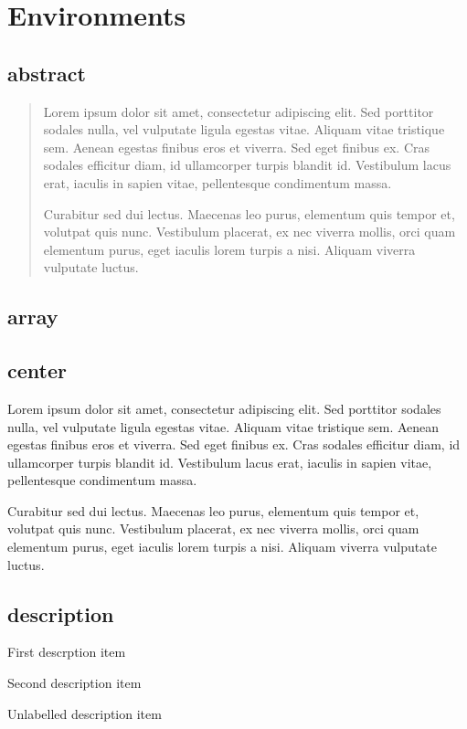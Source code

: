 \documentclass[11pt]{article}
\begin{document}
\section{Environments}
\subsection{abstract}
\begin{abstract}
Lorem ipsum dolor sit amet, consectetur adipiscing elit. Sed porttitor sodales nulla, vel vulputate ligula egestas vitae. Aliquam vitae tristique sem. Aenean egestas finibus eros et viverra. Sed eget finibus ex. Cras sodales efficitur diam, id ullamcorper turpis blandit id. Vestibulum lacus erat, iaculis in sapien vitae, pellentesque condimentum massa.

Curabitur sed dui lectus. Maecenas leo purus, elementum quis tempor et, volutpat quis nunc. Vestibulum placerat, ex nec viverra mollis, orci quam elementum purus, eget iaculis lorem turpis a nisi. Aliquam viverra vulputate luctus.
\end{abstract}

\subsection{array}%

\subsection{center}
\begin{center}
Lorem ipsum dolor sit amet, consectetur adipiscing elit. Sed porttitor sodales nulla, vel vulputate ligula egestas vitae. Aliquam vitae tristique sem. Aenean egestas finibus eros et viverra. Sed eget finibus ex. Cras sodales efficitur diam, id ullamcorper turpis blandit id. Vestibulum lacus erat, iaculis in sapien vitae, pellentesque condimentum massa.

Curabitur sed dui lectus. Maecenas leo purus, elementum quis tempor et, volutpat quis nunc. Vestibulum placerat, ex nec viverra mollis, orci quam elementum purus, eget iaculis lorem turpis a nisi. Aliquam viverra vulputate luctus.
\end{center}

\subsection{description}
\begin{description}
    \item[First] First descrption item
    \item[Second] Second description item
    \item Unlabelled description item
\end{description}
\end{document}
